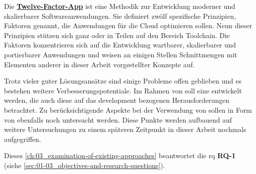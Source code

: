 Die \textbf{\hyperref[sec:03-05_basic-idea-of-twelve-factor-app]{Twelve-Factor-App}} ist eine Methodik zur Entwicklung moderner und skalierbarer Softwareanwendungen. Sie definiert zwölf spezifische Prinzipien, Faktoren genannt, die Anwendungen für die Cloud optimieren sollen. Neun dieser Prinzipien stützen sich ganz oder in Teilen auf den Bereich Toolchain. Die Faktoren konzentrieren sich auf die Entwicklung wartbarer, skalierbarer und portierbarer Anwendungen und weisen an einigen Stellen Schnittmengen mit Elementen anderer in dieser Arbeit vorgestellter Konzepte auf.

Trotz vieler guter Lösungsansätze sind einige Probleme offen geblieben und es bestehen weitere Verbesserungspotentiale. Im Rahmen von  soll eine  entwickelt werden, die auch diese auf das \Gls{development} bezogenen Herausforderungen betrachtet. Zu berücksichtigende Aspekte bei der Verwendung von  sollen in Form von  ebenfalls noch untersucht werden. Diese Punkte werden aufbauend auf weitere Untersuchungen zu einem späteren Zeitpunkt in dieser Arbeit nochmals aufgegriffen.

Dieses \autoref{ch:03_examination-of-existing-approaches} beantwortet die \acrlong{rq} \textbf{RQ-1} (siehe \autoref{sec:01-03_objectives-and-research-questions}).
